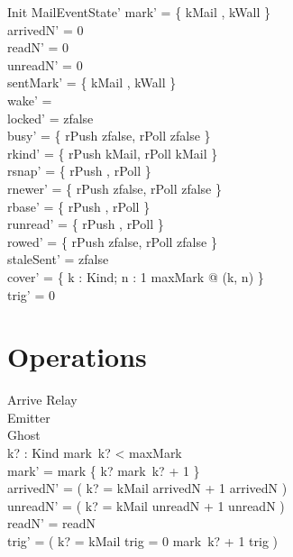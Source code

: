 \documentclass[a4paper,10pt,fleqn]{article}
\begin{document}
\begin{schema}{Init}
  MailEventState'
  \where
  mark' = \{ kMail , kWall  \} \\
  arrivedN' = 0 \\
  readN' = 0 \\
  unreadN' = 0 \\
  sentMark' = \{ kMail , kWall  \} \\
  wake' = \emptyset \\
  locked' = zfalse \\
  busy' = \{ rPush \mapsto zfalse, rPoll \mapsto zfalse \} \\
  rkind' = \{ rPush \mapsto kMail, rPoll \mapsto kMail \} \\
  rsnap' = \{ rPush , rPoll  \} \\
  rnewer' = \{ rPush \mapsto zfalse, rPoll \mapsto zfalse \} \\
  rbase' = \{ rPush , rPoll  \} \\
  runread' = \{ rPush , rPoll  \} \\
  rowed' = \{ rPush \mapsto zfalse, rPoll \mapsto zfalse \} \\
  staleSent' = zfalse \\
  cover' = \{ k : Kind; n : 1 \upto maxMark @ (k, n)  \} \\
  trig' = 0
\end{schema}

\section{Operations}

\begin{schema}{Arrive}
  \Delta Relay \\
  \Xi Emitter \\
  \Delta Ghost \\
  k? : Kind
  \where
  mark~k? < maxMark \\
  mark' = mark \oplus \{ k? \mapsto mark~k? + 1 \} \\
  arrivedN' = ( \IF k? = kMail \THEN arrivedN + 1 \ELSE arrivedN ) \\
  unreadN' = ( \IF k? = kMail \THEN unreadN + 1 \ELSE unreadN ) \\
  readN' = readN \\
  trig' = ( \IF k? = kMail \land trig = 0 \THEN mark~k? + 1 \ELSE trig )
\end{schema}
\end{document}
